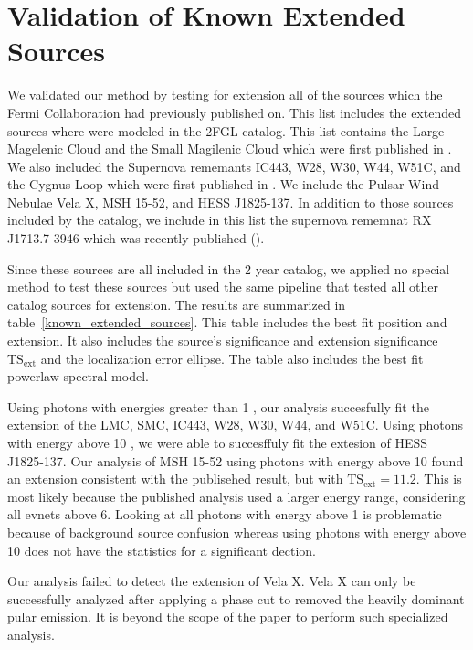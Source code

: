 \documentclass[12pt,preprint]{aastex}
\newcommand{\gev}{\text{GeV}\xspace}
\newcommand{\tsext}{{\ensuremath{\text{TS}_\text{ext}}}\xspace}
\newcommand{\ts}{\text{TS}\xspace}
\begin{document}
\section{Validation of Known Extended Sources}
\label{validate_known}

We validated our method by testing for extension all of the sources
which the Fermi Collaboration had previously published on.  
This list includes the extended sources where were modeled
in the 2FGL catalog\cite{second_cat}.
This list contains the Large Magelenic Cloud and the Small Magilenic Cloud
which were first published in \cite{LMC,SMC}.
We also included the Supernova rememants IC443, W28, W30,
W44, W51C, and the Cygnus Loop which were 
first published in \cite{ic443,w28,w30,w44,w51c,cygnus_loop}.
We include the Pulsar Wind Nebulae Vela X, MSH 15-52, and 
HESS J1825-137\cite{velax,msh1552,fermi_hess_j1825}.
In addition to those sources included by the catalog, we include in
this list the supernova rememnat RX J1713.7-3946 which was recently
published (\cite{RXJ1713}).

Since these sources are all included in the 2 year catalog, we applied
no special method to test these sources but used the same pipeline
that tested all other catalog sources for extension.  The results are
summarized in table~\ref{known_extended_sources}.  This table includes
the best fit position and extension. It also includes the source's
significance \ts and extension significance \tsext and the localization
error ellipse. The table also includes the best fit powerlaw spectral
model.

Using photons with energies greater than 1 \gev, our analysis succesfully
fit the extension of the LMC, SMC, IC443, W28, W30, W44, and W51C.
Using photons with energy above 10 \gev, we were able to succesffuly
fit the extesion of HESS J1825-137.
Our analysis of MSH 15-52 using photons with energy above 10 \gev found an extension
consistent with the publisehed result, but with $\tsext=11.2$. This is
most likely because the published analysis used a larger energy range,
considering all evnets above 6\gev. Looking at all photons with
energy above 1\gev 
is problematic because of background source confusion whereas using photons
with energy above 10\gev does not have the statistics for a significant dection.

Our analysis failed to detect the extension of Vela X. Vela X can only be
successfully analyzed after applying a phase cut to removed the heavily
dominant pular emission. It is beyond the scope of the paper to perform
such specialized analysis.
\end{document}
